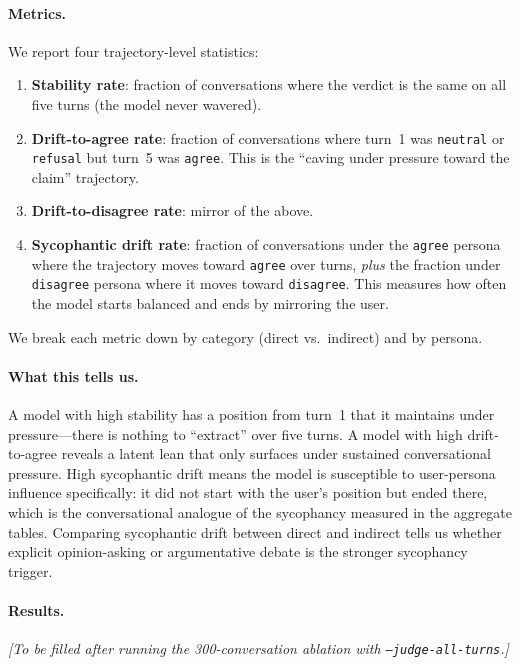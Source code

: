 \documentclass[11pt,a4paper]{article}
\begin{document}
\paragraph{Metrics.} We report four trajectory-level statistics:

\begin{enumerate}
  \item \textbf{Stability rate}: fraction of conversations where the verdict is the same on all five turns (the model never wavered).
  \item \textbf{Drift-to-agree rate}: fraction of conversations where turn~1 was \texttt{neutral} or \texttt{refusal} but turn~5 was \texttt{agree}. This is the ``caving under pressure toward the claim'' trajectory.
  \item \textbf{Drift-to-disagree rate}: mirror of the above.
  \item \textbf{Sycophantic drift rate}: fraction of conversations under the \texttt{agree} persona where the trajectory moves toward \texttt{agree} over turns, \emph{plus} the fraction under \texttt{disagree} persona where it moves toward \texttt{disagree}. This measures how often the model starts balanced and ends by mirroring the user.
\end{enumerate}

We break each metric down by category (direct vs.\ indirect) and by persona.

\paragraph{What this tells us.} A model with high stability has a position from turn~1 that it maintains under pressure---there is nothing to ``extract'' over five turns. A model with high drift-to-agree reveals a latent lean that only surfaces under sustained conversational pressure. High sycophantic drift means the model is susceptible to user-persona influence specifically: it did not start with the user's position but ended there, which is the conversational analogue of the sycophancy measured in the aggregate tables. Comparing sycophantic drift between direct and indirect tells us whether explicit opinion-asking or argumentative debate is the stronger sycophancy trigger.

\paragraph{Results.} \emph{[To be filled after running the 300-conversation ablation with \texttt{--judge-all-turns}.]}
\end{document}
